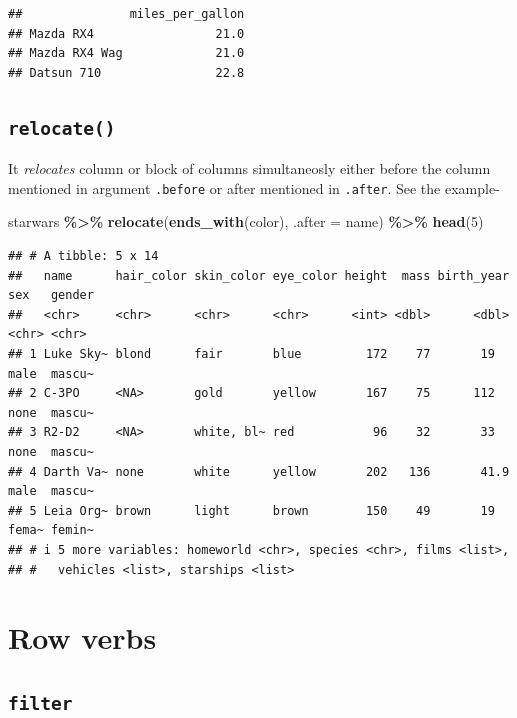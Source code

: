 \documentclass[
]{book}
\newenvironment{Shaded}{\begin{snugshade}}{\end{snugshade}}
\newcommand{\AttributeTok}[1]{\textcolor[rgb]{0.13,0.29,0.53}{#1}}
\newcommand{\DecValTok}[1]{\textcolor[rgb]{0.00,0.00,0.81}{#1}}
\newcommand{\FunctionTok}[1]{\textcolor[rgb]{0.13,0.29,0.53}{\textbf{#1}}}
\newcommand{\NormalTok}[1]{#1}
\newcommand{\SpecialCharTok}[1]{\textcolor[rgb]{0.81,0.36,0.00}{\textbf{#1}}}
\newcommand{\StringTok}[1]{\textcolor[rgb]{0.31,0.60,0.02}{#1}}
\begin{document}
\begin{verbatim}
##               miles_per_gallon
## Mazda RX4                 21.0
## Mazda RX4 Wag             21.0
## Datsun 710                22.8
\end{verbatim}

\hypertarget{relocate}{%
\subsection{\texorpdfstring{\texttt{relocate()}}{relocate()}}\label{relocate}}

It \emph{relocates} column or block of columns simultaneosly either before the column mentioned in argument \texttt{.before} or after mentioned in \texttt{.after}. See the example-

\begin{Shaded}
\begin{Highlighting}[]
\NormalTok{starwars }\SpecialCharTok{\%\textgreater{}\%} 
  \FunctionTok{relocate}\NormalTok{(}\FunctionTok{ends\_with}\NormalTok{(}\StringTok{\textquotesingle{}color\textquotesingle{}}\NormalTok{), }\AttributeTok{.after =}\NormalTok{ name) }\SpecialCharTok{\%\textgreater{}\%} 
  \FunctionTok{head}\NormalTok{(}\DecValTok{5}\NormalTok{)}
\end{Highlighting}
\end{Shaded}

\begin{verbatim}
## # A tibble: 5 x 14
##   name      hair_color skin_color eye_color height  mass birth_year sex   gender
##   <chr>     <chr>      <chr>      <chr>      <int> <dbl>      <dbl> <chr> <chr> 
## 1 Luke Sky~ blond      fair       blue         172    77       19   male  mascu~
## 2 C-3PO     <NA>       gold       yellow       167    75      112   none  mascu~
## 3 R2-D2     <NA>       white, bl~ red           96    32       33   none  mascu~
## 4 Darth Va~ none       white      yellow       202   136       41.9 male  mascu~
## 5 Leia Org~ brown      light      brown        150    49       19   fema~ femin~
## # i 5 more variables: homeworld <chr>, species <chr>, films <list>,
## #   vehicles <list>, starships <list>
\end{verbatim}

\hypertarget{row-verbs}{%
\section{Row verbs}\label{row-verbs}}

\hypertarget{filter}{%
\subsection{\texorpdfstring{\texttt{filter}}{filter}}\label{filter}}
\end{document}
